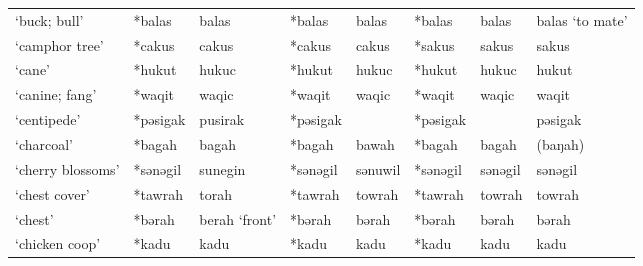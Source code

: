 \begin{landscape}
\begin{longtable}[c]{@{}p{3cm}<{\raggedright}p{2.75cm}<{\raggedright}p{2.75cm}<{\raggedright}p{2.75cm}<{\raggedright}p{2.75cm}<{\raggedright}p{2.75cm}<{\raggedright}p{2.75cm}<{\raggedright}p{2.75cm}<{\raggedright}@{}}
`buck; bull'                                         & *balas       & balas                         & *balas         & balas                      & *balas           & balas                    & balas `to mate'                   \\
`camphor tree'                                       & *cakus       & cakus                         & *cakus         & cakus                      & *sakus           & sakus                    & sakus                             \\
`cane'                                               & *hukut       & hukuc                         & *hukut         & hukuc                      & *hukut           & hukuc                    & hukut                             \\
`canine; fang'                                       & *waqit       & waqic                         & *waqit         & waqic                      & *waqit           & waqic                    & waqit                             \\
`centipede'                                          & *pəsigak     & pusirak                       & *pəsigak       &                            & *pəsigak         &                          & pəsigak                           \\
`charcoal'                                           & *bagah       & bagah                         & *bagah         & bawah                      & *bagah           & bagah                    & (baŋah)                           \\
`cherry blossoms'                                    & *sənəgil     & sunegin                       & *sənəgil       & sənuwil                    & *sənəgil         & sənəgil                  & sənəgil                           \\
`chest cover'                                        & *tawrah      & torah                         & *tawrah        & towrah                     & *tawrah          & towrah                   & towrah                            \\
`chest'                                              & *bərah       & berah `front'                 & *bərah         & bərah                      & *bərah           & bərah                    & bərah                             \\
`chicken coop'                                       & *kadu        & kadu                          & *kadu          & kadu                       & *kadu            & kadu                     & kadu                              \\

\end{longtable}
\end{landscape}

